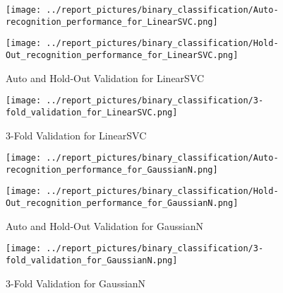
        \begin{figure}[H]
            \begin{minipage}[c]{.46\linewidth}
                  \texttt{[image: ../report\_pictures/binary\_classification/Auto-recognition\_performance\_for\_LinearSVC.png]}
            \end{minipage} \hfill
            \begin{minipage}[c]{.46\linewidth}
                \texttt{[image: ../report\_pictures/binary\_classification/Hold-Out\_recognition\_performance\_for\_LinearSVC.png]}
            \end{minipage}
            \caption{Auto and Hold-Out Validation for LinearSVC}
            \label{CV_LinearSVC}
        \end{figure}   
   
        \begin{figure}[H]
            \texttt{[image: ../report\_pictures/binary\_classification/3-fold\_validation\_for\_LinearSVC.png]}
        \caption{3-Fold Validation for LinearSVC}
        \label{3Fold_LinearSVC}
        \end{figure} 
        
        \begin{figure}[H]
            \begin{minipage}[c]{.46\linewidth}
                  \texttt{[image: ../report\_pictures/binary\_classification/Auto-recognition\_performance\_for\_GaussianN.png]}
            \end{minipage} \hfill
            \begin{minipage}[c]{.46\linewidth}
                \texttt{[image: ../report\_pictures/binary\_classification/Hold-Out\_recognition\_performance\_for\_GaussianN.png]}
            \end{minipage}
            \caption{Auto and Hold-Out Validation for GaussianN}
            \label{CV_GaussianN}
        \end{figure}   
   
        \begin{figure}[H]
            \texttt{[image: ../report\_pictures/binary\_classification/3-fold\_validation\_for\_GaussianN.png]}
        \caption{3-Fold Validation for GaussianN}
        \label{3Fold_GaussianN}
        \end{figure} 
        
